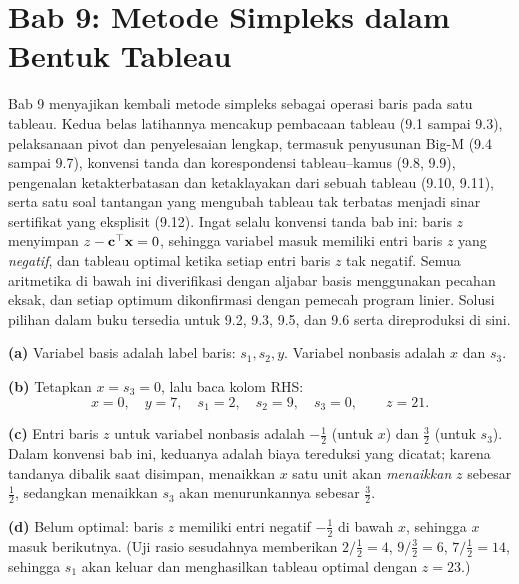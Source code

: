 \section{Bab 9: Metode Simpleks dalam Bentuk Tableau}

Bab 9 menyajikan kembali metode simpleks sebagai operasi baris pada satu
tableau. Kedua belas latihannya mencakup pembacaan tableau (9.1 sampai 9.3),
pelaksanaan pivot dan penyelesaian lengkap, termasuk penyusunan Big-M (9.4 sampai
9.7), konvensi tanda dan korespondensi tableau--kamus (9.8, 9.9), pengenalan
ketakterbatasan dan ketaklayakan dari sebuah tableau (9.10, 9.11), serta satu
soal tantangan yang mengubah tableau tak terbatas menjadi sinar sertifikat yang
eksplisit (9.12). Ingat selalu konvensi tanda bab ini: baris $z$ menyimpan
$z - \mathbf{c}^\top\mathbf{x} = 0$, sehingga variabel masuk memiliki entri baris $z$ yang
\emph{negatif}, dan tableau optimal ketika setiap entri baris $z$ tak negatif.
Semua aritmetika di bawah ini diverifikasi dengan aljabar basis menggunakan
pecahan eksak, dan setiap optimum dikonfirmasi dengan pemecah program linier. Solusi
pilihan dalam buku tersedia untuk 9.2, 9.3, 9.5, dan 9.6 serta direproduksi di
sini.


\textbf{(a)} Variabel basis adalah label baris: $s_1, s_2, y$. Variabel
nonbasis adalah $x$ dan $s_3$.

\textbf{(b)} Tetapkan $x = s_3 = 0$, lalu baca kolom RHS:
\[
x = 0,\quad y = 7,\quad s_1 = 2,\quad s_2 = 9,\quad s_3 = 0,
\qquad z = 21.
\]

\textbf{(c)} Entri baris $z$ untuk variabel nonbasis adalah
$-\tfrac12$ (untuk $x$) dan $\tfrac32$ (untuk $s_3$). Dalam konvensi bab
ini, keduanya adalah biaya tereduksi yang dicatat; karena tandanya dibalik saat
disimpan, menaikkan $x$ satu unit akan \emph{menaikkan} $z$ sebesar $\tfrac12$,
sedangkan menaikkan $s_3$ akan menurunkannya sebesar $\tfrac32$.

\textbf{(d)} Belum optimal: baris $z$ memiliki entri negatif $-\tfrac12$
di bawah $x$, sehingga $x$ masuk berikutnya. (Uji rasio sesudahnya memberikan
$2/\tfrac12 = 4$, $9/\tfrac32 = 6$, $7/\tfrac12 = 14$, sehingga $s_1$ akan
keluar dan menghasilkan tableau optimal dengan $z = 23$.)

